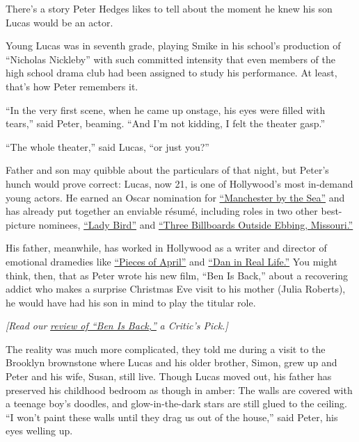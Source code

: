 There's a story Peter Hedges likes to tell about the moment he knew his
son Lucas would be an actor.

Young Lucas was in seventh grade, playing Smike in his school's
production of ``Nicholas Nickleby'' with such committed intensity that
even members of the high school drama club had been assigned to study
his performance. At least, that's how Peter remembers it.

``In the very first scene, when he came up onstage, his eyes were filled
with tears,'' said Peter, beaming. ``And I'm not kidding, I felt the
theater gasp.''

``The whole theater,'' said Lucas, ``or just you?''

Father and son may quibble about the particulars of that night, but
Peter's hunch would prove correct: Lucas, now 21, is one of Hollywood's
most in-demand young actors. He earned an Oscar nomination for
\href{https://www.nytimes3xbfgragh.onion/2016/11/18/movies/manchester-by-the-sea-review-kenneth-lonergan-casey-affleck.html}{``Manchester
by the Sea''} and has already put together an enviable résumé, including
roles in two other best-picture nominees,
\href{https://www.nytimes3xbfgragh.onion/2017/10/31/movies/lady-bird-review-greta-gerwig-saoirse-ronan.html}{``Lady
Bird''} and
\href{https://www.nytimes3xbfgragh.onion/2017/11/08/movies/review-three-billboards-outside-ebbing-missouri-martin-mcdonagh.html}{``Three
Billboards Outside Ebbing, Missouri.''}

His father, meanwhile, has worked in Hollywood as a writer and director
of emotional dramedies like
\href{https://www.nytimes3xbfgragh.onion/2003/10/17/movies/film-review-second-helpings-of-hollow-cheer.html}{``Pieces
of April''} and
\href{https://www.nytimes3xbfgragh.onion/2007/10/26/movies/26dan.html}{``Dan
in Real Life.''} You might think, then, that as Peter wrote his new
film, ``Ben Is Back,'' about a recovering addict who makes a surprise
Christmas Eve visit to his mother (Julia Roberts), he would have had his
son in mind to play the titular role.

\emph{{[}Read our}
\href{https://www.nytimes3xbfgragh.onion/2018/12/05/movies/ben-is-back-review.html}{\emph{review
of ``Ben Is Back,''}} \emph{a Critic's Pick.{]}}

The reality was much more complicated, they told me during a visit to
the Brooklyn brownstone where Lucas and his older brother, Simon, grew
up and Peter and his wife, Susan, still live. Though Lucas moved out,
his father has preserved his childhood bedroom as though in amber: The
walls are covered with a teenage boy's doodles, and glow-in-the-dark
stars are still glued to the ceiling. ``I won't paint these walls until
they drag us out of the house,'' said Peter, his eyes welling up.

